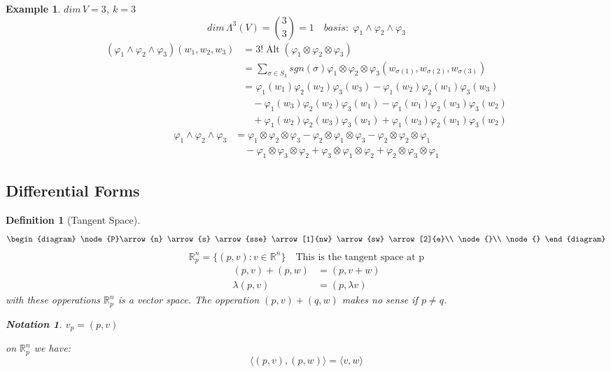 \documentclass[11pt]{article}
\def\RR{\mathbb{R}}
\DeclareMathOperator{\alt}{Alt}
\newtheorem{definition}{Definition}[section]
\newtheorem{example}{Example}[section]
\newtheorem*{notation}{Notation}
\begin{document}
\begin{example}
$dim\,V = 3$, $k=3$
\[dim\,\Lambda^3(V) = {3 \choose 3} = 1\quad basis:\; \varphi_1\wedge\varphi_2\wedge\varphi_3\]
\begin{align*}
(\varphi_1\wedge\varphi_2\wedge\varphi_3)(w_1,w_2,w_3) &= 3!\alt(\varphi_1\otimes\varphi_2\otimes\varphi_3)\\
&=\sum\limits_{\sigma \in S_3}sgn(\sigma)\varphi_1\otimes\varphi_2\otimes\varphi_3(w_{\sigma(1)}, w_{\sigma(2)}, w_{\sigma(3)})\\ 
&=\varphi_1(w_1)\varphi_2(w_2)\varphi_3(w_3) - \varphi_1(w_2)\varphi_2(w_1)\varphi_3(w_3)\\ & \quad - \varphi_1(w_3)\varphi_2(w_2)\varphi_3(w_1) - \varphi_1(w_1)\varphi_2(w_3)\varphi_3(w_2) \\ & \quad + \varphi_1(w_2)\varphi_2(w_3)\varphi_3(w_1) + \varphi_1(w_3)\varphi_2(w_1)\varphi_3(w_2)
\end{align*}
\begin{align*}
\varphi_1\wedge\varphi_2\wedge\varphi_3 &= \varphi_1\otimes\varphi_2\otimes\varphi_3 - \varphi_2\otimes\varphi_1\otimes\varphi_3 - \varphi_2\otimes\varphi_2\otimes\varphi_1\\ & \quad- \varphi_1\otimes\varphi_3\otimes\varphi_2 + \varphi_3\otimes\varphi_1\otimes\varphi_2 + \varphi_2\otimes\varphi_3\otimes\varphi_1
\end{align*}
\end{example}


\subsection{Differential Forms}

\begin{definition}[Tangent Space]\quad \\
\[\begin{diagram}
\node{P}\arrow{n} \arrow{s} \arrow{sse} \arrow[1]{nw} \arrow{sw} \arrow[2]{e}\\
\node{}\\
\node{}
\end{diagram} \]
\[\RR_p^n = \{(p,v) : v \in \RR^n\} \quad \text{This is the tangent space at p}\]
\begin{align*}
(p,v) + (p,w) &= (p,v+w)\\
\lambda(p,v) &= (p,\lambda v) 
\end{align*}
with these opperations $\RR_p^n$ is a vector space.
The opperation $(p,v) + (q,w)$ makes no sense if $p \neq q$. 
\begin{notation} $v_p = (p,v)$ \end{notation}
on $\RR_p^n$ we have:
\[ \langle (p,v), (p,w)\rangle = \langle v,w \rangle \]
\end{definition}
\end{document}
